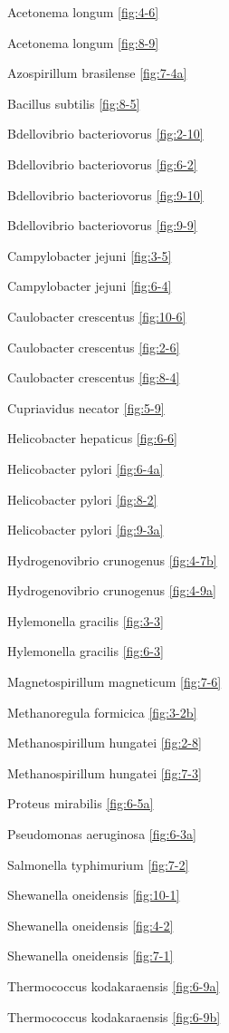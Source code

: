 \documentclass[]{tufte-book}
\begin{document}
Acetonema longum \ref{fig:4-6}

Acetonema longum \ref{fig:8-9}

Azospirillum brasilense \ref{fig:7-4a}

Bacillus subtilis \ref{fig:8-5}

Bdellovibrio bacteriovorus \ref{fig:2-10}

Bdellovibrio bacteriovorus \ref{fig:6-2}

Bdellovibrio bacteriovorus \ref{fig:9-10}

Bdellovibrio bacteriovorus \ref{fig:9-9}

Campylobacter jejuni \ref{fig:3-5}

Campylobacter jejuni \ref{fig:6-4}

Caulobacter crescentus \ref{fig:10-6}

Caulobacter crescentus \ref{fig:2-6}

Caulobacter crescentus \ref{fig:8-4}

Cupriavidus necator \ref{fig:5-9}

Helicobacter hepaticus \ref{fig:6-6}

Helicobacter pylori \ref{fig:6-4a}

Helicobacter pylori \ref{fig:8-2}

Helicobacter pylori \ref{fig:9-3a}

Hydrogenovibrio crunogenus \ref{fig:4-7b}

Hydrogenovibrio crunogenus \ref{fig:4-9a}

Hylemonella gracilis \ref{fig:3-3}

Hylemonella gracilis \ref{fig:6-3}

Magnetospirillum magneticum \ref{fig:7-6}

Methanoregula formicica \ref{fig:3-2b}

Methanospirillum hungatei \ref{fig:2-8}

Methanospirillum hungatei \ref{fig:7-3}

Proteus mirabilis \ref{fig:6-5a}

Pseudomonas aeruginosa \ref{fig:6-3a}

Salmonella typhimurium \ref{fig:7-2}

Shewanella oneidensis \ref{fig:10-1}

Shewanella oneidensis \ref{fig:4-2}

Shewanella oneidensis \ref{fig:7-1}

Thermococcus kodakaraensis \ref{fig:6-9a}

Thermococcus kodakaraensis \ref{fig:6-9b}
\end{document}
